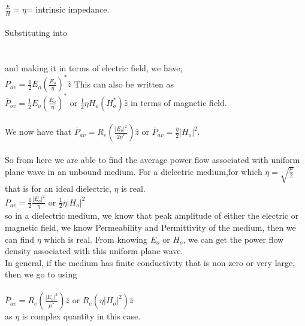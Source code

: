 $ \frac{E}{H}=\eta $= intrinsic impedance.\\\\
 Substituting into \\\\
[$ \overline{P}_{av}=\frac{1}{2}(E_{o}H_{o}z^{*}) $] 
\\and making it in terms of electric field,  we have;\\ $ \overline{P}_{av}=\frac{1}{2}E_{o}(\frac{E_{o}}{\eta})^{*}\hat{z} $ This can also be written as\\$ \overline{P}_{ov}=\frac{1}{2}E_{o}(\frac{E_{o}}{\eta})^{*} $ or  $ \frac{1}{2}\eta H_{o}(H_{o}^{*})\hat{z} $ in terms of magnetic field.\\ \\ We now have that $ \overline{P}_{av}=R_{e}(\frac{|E_{o}|^{2}}{2\eta^{*}})\hat{z} $ or $ \overline{P}_{av}=\frac{\eta}{2}|H_{o}|^{2} $.\\\\So from here we are able to find the average power flow associated with uniform plane wave in an unbound medium. For a dielectric medium,for which $ \eta=\sqrt{\frac{\mu}{2}} $ that is for an ideal dielectric, $ \eta $ is real.\\$ \overline{P}_{av}=\frac{1}{2}\frac{|E_{o}|^{2}}{\eta} $ or $ \frac{1}{2}\eta|H_{o}|^{2} $\\ so in a dielectric medium, we know  that peak amplitude of either the electric or magnetic field, we know Permeability and Permittivity of the medium, then we can find $ \eta $ which is real. From knowing $ E_{o} $ or $ H_{o} $, we can get the power flow density associated with this uniform plane wave.\\

In general, if the medium has finite conductivity that is non zero or very large, then we go to using\\\\ $ \overline{P}_{av}=R_{e}(\frac{|E_{o}|^{2}}{\mu^{*}})\hat{z} $ or $ R_{e}(\eta|H_{o}|^{2})\hat{z} $ \\as $ \eta $ is complex quantity in this case.\\

